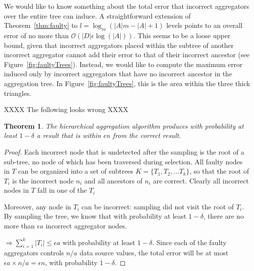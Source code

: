 \documentclass[11pt,twocolumn]{MyTightStyle}
\theoremstyle{plain}
\newtheorem{thm}{Theorem}
\theoremstyle{definition}
\theoremstyle{remark}
\numberwithin{equation}{section}
\begin{document}
We would like to know something about the total error that incorrect
aggregators over the entire tree can induce.  A straightforward
extension of Theorem~\ref{thm:faulty} to $l=\log_m(|A|m-|A|+1)$ levels
points to an overall error of no more than
$\mathcal{O}(|D|\epsilon\log(|A|))$. This seems to be a loose upper
bound, given that incorrect aggregators placed within the subtree of
another incorrect aggregator cannot add their error to that of their
incorrect ancestor (see Figure~\ref{fig:faultyTrees}).  Instead, we
would like to compute the maximum error induced only by incorrect
aggregators that have no incorrect ancestor in the aggregation tree.  In
Figure~\ref{fig:faultyTrees}, this is the area within the three
thick triangles.


XXXX The following looks wrong XXXX


\begin{thm} The hierarchical aggregation algorithm produces with
  probability at least $1-\delta$ a result
  that is within $\epsilon n$ from the correct result.
\end{thm}

\begin{proof}
Each incorrect node that is undetected after the sampling is the root
of a sub-tree, no node of which has been traversed during
selection. All faulty nodes in $T$ can be organized into a set of
subtrees $K = \{T_1, T_2,\ldots T_k\}$, so that the root of $T_i$ is
the incorrect node $n_i$ and all ancestors of $n_i$ are correct. Clearly all incorrect
nodes in $T$ fall in one of the $T_i$


Moreover, any node in $T_i$
can be incorrect: sampling did not visit the root of $T_i$. By
sampling the tree, we know that with probability at least $1-\delta$,
there are no more than $\epsilon a$ incorrect aggregator nodes.

$\Rightarrow \sum_{i=1}^{k}|T_i| \leq \epsilon a$ with probability at
least $1-\delta$. Since each of the
faulty aggregators controls $n/a$ data source values, the total error
will be at most $\epsilon a \times n/a = \epsilon n$, with probability
$1-\delta$.
\end{proof}
\end{document}

